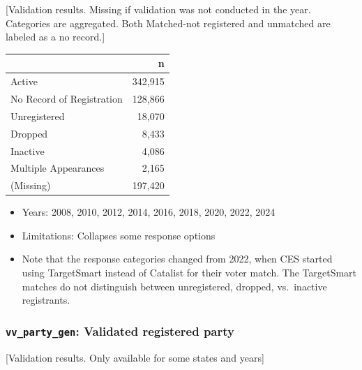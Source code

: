 \documentclass[10pt,article,oneside]{memoir}
\begin{document}
{[}Validation results. Missing if validation was not conducted in the
year. Categories are aggregated. Both Matched-not registered and
unmatched are labeled as a no record.{]}

\begin{table}[H]
\centering
\begin{tabular}[t]{lr}
\toprule
 & n\\
\midrule
Active & 342,915\\
No Record of Registration & 128,866\\
Unregistered & 18,070\\
Dropped & 8,433\\
Inactive & 4,086\\
Multiple Appearances & 2,165\\
(Missing) & 197,420\\
\bottomrule
\end{tabular}
\end{table}

\begin{itemize}
\tightlist
\item
  Years: 2008, 2010, 2012, 2014, 2016, 2018, 2020, 2022, 2024
\item
  Limitations: Collapses some response options
\item
  Note that the response categories changed from 2022, when CES started
  using TargetSmart instead of Catalist for their voter match. The
  TargetSmart matches do not distinguish between unregistered, dropped,
  vs.~inactive registrants.
\end{itemize}

\subsubsection{\texorpdfstring{\texttt{vv\_party\_gen}: Validated
registered
party}{vv\_party\_gen: Validated registered party}}\label{vv_party_gen-validated-registered-party}

{[}Validation results. Only available for some states and years{]}
\end{document}
